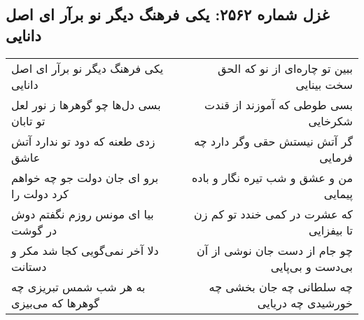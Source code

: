 \begin{center}
\section*{غزل شماره ۲۵۶۲: یکی فرهنگ دیگر نو برآر ای اصل دانایی}
\label{sec:2562}
\begin{longtable}{l p{0.5cm} r}
یکی فرهنگ دیگر نو برآر ای اصل دانایی
&&
ببین تو چاره‌ای از نو که الحق سخت بینایی
\\
بسی دل‌ها چو گوهرها ز نور لعل تو تابان
&&
بسی طوطی که آموزند از قندت شکرخایی
\\
زدی طعنه که دود تو ندارد آتش عاشق
&&
گر آتش نیستش حقی وگر دارد چه فرمایی
\\
برو ای جان دولت جو چه خواهم کرد دولت را
&&
من و عشق و شب تیره نگار و باده پیمایی
\\
بیا ای مونس روزم نگفتم دوش در گوشت
&&
که عشرت در کمی خندد تو کم زن تا بیفزایی
\\
دلا آخر نمی‌گویی کجا شد مکر و دستانت
&&
چو جام از دست جان نوشی از آن بی‌دست و بی‌پایی
\\
به هر شب شمس تبریزی چه گوهرها که می‌بیزی
&&
چه سلطانی چه جان بخشی چه خورشیدی چه دریایی
\\
\end{longtable}
\end{center}
